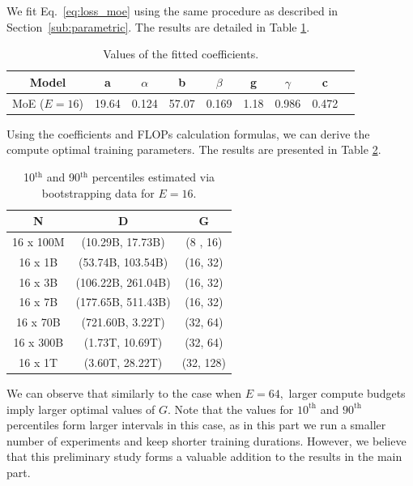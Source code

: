 \documentclass{article} %
\theoremstyle{plain}
\theoremstyle{definition}
\theoremstyle{remark}
\begin{document}
We fit Eq.~\ref{eq:loss_moe} using the same procedure as described in Section~\ref{sub:parametric}. The results are detailed in Table \ref{tab:_different_e}.

\begin{table}[ht!]
    \centering
        \caption{Values of the fitted coefficients.}
    \vspace{0.4cm}
    \begin{tabular}{ccccccccc}
    
    \toprule
        Model  & a & $\alpha$ & b & $\beta$ & g & $\gamma$ & c \\
        \midrule
        MoE ($E=16$)  & 19.64 & 0.124 & 57.07 & 0.169 & 1.18 & 0.986 & 0.472 \\  \bottomrule
    \end{tabular}
    \label{tab:_different_e}
\end{table}

Using the coefficients and FLOPs calculation formulas, we can derive the compute optimal training parameters. The results are presented in Table \ref{tab:compute_opt_16}.

\begin{table}[ht!]
    \caption{10$^\text{th}$ and 90$^\text{th}$ percentiles estimated via bootstrapping data for $E=16$.}
    \centering
    \vspace{0.4cm}
    \begin{tabular}{ccc}
    \toprule
        N & D & G \\
        \midrule
        16 x 100M & (10.29B, 17.73B)   & (8 , 16)  \\
        16 x 1B   & (53.74B, 103.54B)  & (16, 32)  \\
        16 x 3B   & (106.22B, 261.04B) & (16, 32)  \\
        16 x 7B   & (177.65B, 511.43B) & (16, 32)  \\
        16 x 70B  & (721.60B, 3.22T)   & (32, 64)  \\
        16 x 300B & (1.73T, 10.69T)    & (32, 64)  \\
        16 x 1T   & (3.60T, 28.22T)    & (32, 128)  \\ \bottomrule
    \end{tabular}
    \label{tab:compute_opt_16}
\end{table}

We can observe that similarly to the case when $E=64,$ larger compute budgets imply larger optimal values of $G.$ Note that the values for $10^\text{th}$ and $90^\text{th}$ percentiles form larger intervals in this case, as in this part we run a smaller number of experiments and keep shorter training durations. However, we believe that this preliminary study forms a valuable addition to the results in the main part.
\end{document}
